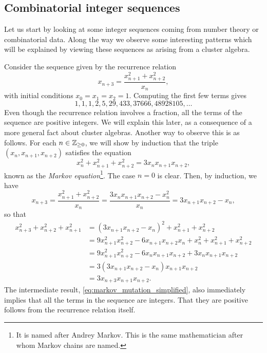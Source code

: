 \subsection{Combinatorial integer sequences}\label{sec:integer_sequences}

Let us start by looking at some integer sequences coming from number theory or
combinatorial data. Along the way we observe some interesting patterns which will be
explained by viewing these sequences as arising from a cluster algebra. \medskip

\begin{example}\label{exmp:markov_sequence}
	Consider the sequence given by the recurrence relation
	\begin{equation*}
		x_{n+3} = \frac{x_{n+1}^2 + x_{n+2}^2}{x_n},
	\end{equation*}
	with initial conditions $x_0 = x_1 = x_2 = 1$. Computing the first few terms gives
	\begin{equation*}
		1,1,1,2,5,29,433,37666,48928105,\dots
	\end{equation*}
	Even though the recurrence relation involves a fraction, all the terms of the sequence
	are positive integers. We will explain this later, as a consequence of a more general
	fact about cluster algebras. Another way to observe this is as follows. For each $n \in
		\mathbb{Z}_{\geq0}$, we will show by induction that the triple $(x_n, x_{n+1}, x_{n+2})$
	satisfies the equation
	\begin{equation}\label{eq:markov_diophantine}
		x_n^2 + x_{n+1}^2 + x_{n+2}^2 = 3 x_n x_{n+1}x_{n+2},
	\end{equation}
	known as the \emph{Markov equation}\footnote{It is named after Andrey Markov. This is the same mathematician after whom Markov chains are named.}. The case $n = 0$ is clear. Then, by induction, we have
	\begin{equation}\label{eq:markov_mutation_simplified}
		x_{n+3} = \frac{x_{n+1}^2 + x_{n+2}^2}{x_n} = \frac{3 x_n x_{n+1}x_{n+2} - x_n^2}{x_n} = 3 x_{n+1} x_{n+2} - x_n,
	\end{equation}
	so that
	\begin{align*}
		x_{n+3}^2 + x_{n+2}^2 + x_{n+1}^2
		 & = (3 x_{n+1}x_{n+2} - x_n)^2 + x_{n+1}^2 + x_{n+2}^2                            \\
		 & = 9 x_{n+1}^2 x_{n+2}^2 - 6 x_{n+1} x_{n+2} x_n + x_n^2 + x_{n+1}^2 + x_{n+2}^2 \\
		 & = 9 x_{n+1}^2 x_{n+2}^2 - 6 x_n x_{n+1} x_{n+2} + 3 x_n x_{n+1} x_{n+2}         \\
		 & = 3 (3 x_{n+1} x_{n+2}-  x_n) x_{n+1} x_{n+2}                                   \\
		 & = 3 x_{n+3} x_{n+1} x_{n+2}.
	\end{align*}
	The intermediate result, \cref{eq:markov_mutation_simplified}, also immediately implies
	that all the terms in the sequence are integers. That they are positive follows from
	the recurrence relation itself.
\end{example}

